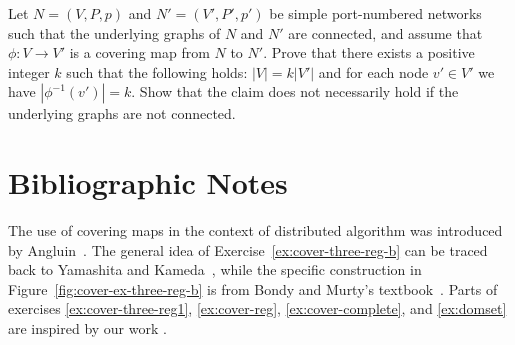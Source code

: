 \begin{exs}
    Let $N = (V,P,p)$ and $N' = (V'\!,P'\!,p')$ be simple port-numbered networks
    such that the underlying graphs of $N$ and $N'$ are connected, and
    assume that $\phi\colon V \to V'$ is a covering map from $N$ to $N'$.
    Prove that there exists a positive integer $k$ such that the following holds:
    $|V| = k |V'|$ and for each node $v' \in V'$ we have $|\phi^{-1}(v')| = k$.
    Show that the claim does not necessarily hold if the underlying graphs are not connected.
\end{exs}


\section{Bibliographic Notes}

The use of covering maps in the context of distributed algorithm was introduced by Angluin~\cite{angluin80local}. The general idea of Exercise~\ref{ex:cover-three-reg-b} can be traced back to Yamashita and Kameda~\cite{yamashita96computing}, while the specific construction in Figure~\ref{fig:cover-ex-three-reg-b} is from Bondy and Murty's textbook~\cite[Figure~5.10]{bondy76graph-theory}. Parts of exercises \ref{ex:cover-three-reg1}, \ref{ex:cover-reg}, \ref{ex:cover-complete}, and \ref{ex:domset} are inspired by our work \cite{suomela10eds,astrand10weakly-coloured}.
